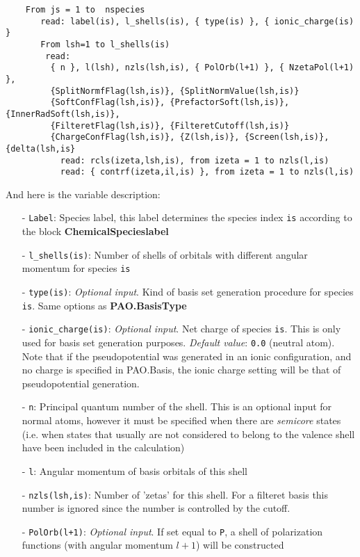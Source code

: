 \documentclass[11pt]{article}
\begin{document}
\begin{description}
\begin{verbatim}
    From js = 1 to  nspecies
       read: label(is), l_shells(is), { type(is) }, { ionic_charge(is) }
       From lsh=1 to l_shells(is)
        read:
         { n }, l(lsh), nzls(lsh,is), { PolOrb(l+1) }, { NzetaPol(l+1) },
         {SplitNormfFlag(lsh,is)}, {SplitNormValue(lsh,is)}
         {SoftConfFlag(lsh,is)}, {PrefactorSoft(lsh,is)}, {InnerRadSoft(lsh,is)},
         {FilteretFlag(lsh,is)}, {FilteretCutoff(lsh,is)}
         {ChargeConfFlag(lsh,is)}, {Z(lsh,is)}, {Screen(lsh,is)}, {delta(lsh,is}
           read: rcls(izeta,lsh,is), from izeta = 1 to nzls(l,is)
           read: { contrf(izeta,il,is) }, from izeta = 1 to nzls(l,is)
\end{verbatim}

\noindent
And here is the variable description:
\begin{itemize}
\item[-] {\tt Label}: Species label, this label determines
the species index {\tt is} according to the block {\bf ChemicalSpecieslabel}
\item[-] {\tt l\_shells(is)}: Number of shells of orbitals
with different angular momentum for species {\tt is}
\item[-] {\tt type(is)}: {\it Optional input}.
Kind of basis set generation procedure for species {\tt is}.
Same options as {\bf PAO.BasisType}
\item[-] {\tt ionic\_charge(is)}: {\it Optional input}.
Net charge of species {\tt is}. This is  only used for
basis set generation purposes. {\it Default value}: {\tt 0.0} (neutral
atom). Note that if the pseudopotential was generated in an ionic
configuration, and no charge is specified in PAO.Basis, the ionic
charge setting will be that of pseudopotential generation.
\item[-] {\tt n}: Principal quantum number of the shell. This is an optional
input for normal atoms, however it must be specified when there are
{\it semicore} states (i.e. when states that usually are not
considered to belong to the
valence shell have been included in the calculation)
\item[-] {\tt l}: Angular momentum of
basis orbitals of this shell
\item[-] {\tt nzls(lsh,is)}: Number of 'zetas' for this shell. For a filteret 
basis this number is ignored since the number is controlled by the cutoff.
\item[-] {\tt PolOrb(l+1)}: {\it Optional input}. If set equal to {\tt P}, a
shell of
polarization functions (with angular momentum $l+1$)  will be constructed

\end{itemize}
\end{description}
\end{document}
